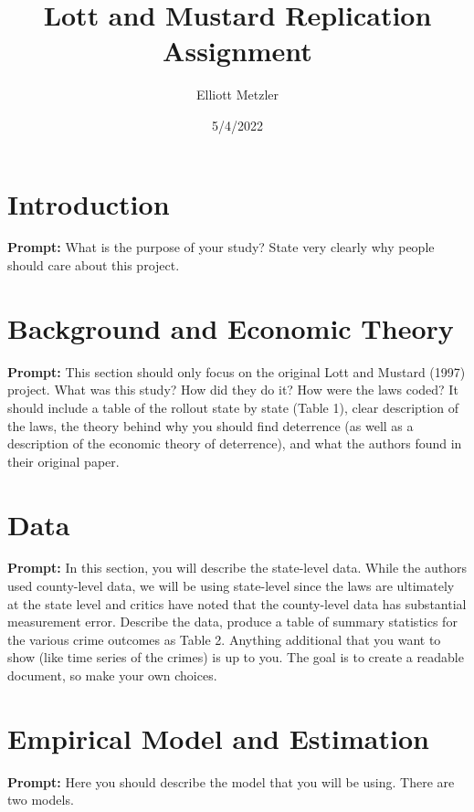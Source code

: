 \documentclass{article}
\author{Elliott Metzler}
\title{Lott and Mustard Replication Assignment}
\date{5/4/2022}
\begin{document}
\maketitle

\section{Introduction}

\textbf{Prompt:}  What is the purpose of your study?  State very clearly why people should care about this project.  

\section{Background and Economic Theory}

\textbf{Prompt:} This section should only focus on the original Lott and Mustard (1997) project.  What was this study?  How did they do it?  How were the laws coded?  It should include a table of the rollout state by state (Table 1), clear description of the laws, the theory behind why you should find deterrence (as well as a description of the economic theory of deterrence), and what the authors found in their original paper.  



\section{Data}

\textbf{Prompt:} In this section, you will describe the state-level data.  While the authors used county-level data, we will be using state-level since the laws are ultimately at the state level and critics have noted that the county-level data has substantial measurement error.  Describe the data, produce a table of summary statistics for the various crime outcomes as Table 2. Anything additional that you want to show (like time series of the crimes) is up to you. The goal is to create a readable document, so make your own choices.






\section{Empirical Model and Estimation}

\textbf{Prompt: } Here you should describe the model that you will be using.  There are two models.
\end{document}
